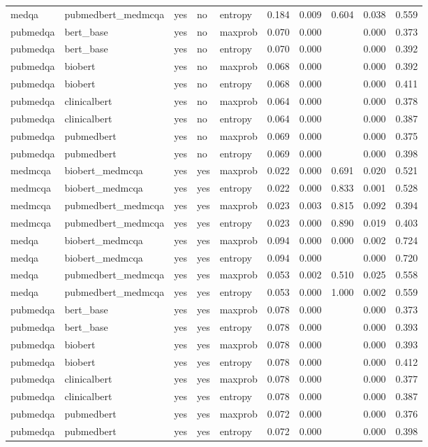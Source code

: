 \begin{table}[htbp]
\begin{tabular}{llllllllll}
medqa & pubmedbert\_medmcqa & yes & no & entropy & 0.184 & 0.009 & 0.604 & 0.038 & 0.559 \\
pubmedqa & bert\_base & yes & no & maxprob & 0.070 & 0.000 &  & 0.000 & 0.373 \\
pubmedqa & bert\_base & yes & no & entropy & 0.070 & 0.000 &  & 0.000 & 0.392 \\
pubmedqa & biobert & yes & no & maxprob & 0.068 & 0.000 &  & 0.000 & 0.392 \\
pubmedqa & biobert & yes & no & entropy & 0.068 & 0.000 &  & 0.000 & 0.411 \\
pubmedqa & clinicalbert & yes & no & maxprob & 0.064 & 0.000 &  & 0.000 & 0.378 \\
pubmedqa & clinicalbert & yes & no & entropy & 0.064 & 0.000 &  & 0.000 & 0.387 \\
pubmedqa & pubmedbert & yes & no & maxprob & 0.069 & 0.000 &  & 0.000 & 0.375 \\
pubmedqa & pubmedbert & yes & no & entropy & 0.069 & 0.000 &  & 0.000 & 0.398 \\
medmcqa & biobert\_medmcqa & yes & yes & maxprob & 0.022 & 0.000 & 0.691 & 0.020 & 0.521 \\
medmcqa & biobert\_medmcqa & yes & yes & entropy & 0.022 & 0.000 & 0.833 & 0.001 & 0.528 \\
medmcqa & pubmedbert\_medmcqa & yes & yes & maxprob & 0.023 & 0.003 & 0.815 & 0.092 & 0.394 \\
medmcqa & pubmedbert\_medmcqa & yes & yes & entropy & 0.023 & 0.000 & 0.890 & 0.019 & 0.403 \\
medqa & biobert\_medmcqa & yes & yes & maxprob & 0.094 & 0.000 & 0.000 & 0.002 & 0.724 \\
medqa & biobert\_medmcqa & yes & yes & entropy & 0.094 & 0.000 &  & 0.000 & 0.720 \\
medqa & pubmedbert\_medmcqa & yes & yes & maxprob & 0.053 & 0.002 & 0.510 & 0.025 & 0.558 \\
medqa & pubmedbert\_medmcqa & yes & yes & entropy & 0.053 & 0.000 & 1.000 & 0.002 & 0.559 \\
pubmedqa & bert\_base & yes & yes & maxprob & 0.078 & 0.000 &  & 0.000 & 0.373 \\
pubmedqa & bert\_base & yes & yes & entropy & 0.078 & 0.000 &  & 0.000 & 0.393 \\
pubmedqa & biobert & yes & yes & maxprob & 0.078 & 0.000 &  & 0.000 & 0.393 \\
pubmedqa & biobert & yes & yes & entropy & 0.078 & 0.000 &  & 0.000 & 0.412 \\
pubmedqa & clinicalbert & yes & yes & maxprob & 0.078 & 0.000 &  & 0.000 & 0.377 \\
pubmedqa & clinicalbert & yes & yes & entropy & 0.078 & 0.000 &  & 0.000 & 0.387 \\
pubmedqa & pubmedbert & yes & yes & maxprob & 0.072 & 0.000 &  & 0.000 & 0.376 \\
pubmedqa & pubmedbert & yes & yes & entropy & 0.072 & 0.000 &  & 0.000 & 0.398 \\
\bottomrule
\end{tabular}
\end{table}
